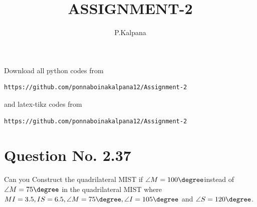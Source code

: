 \documentclass[journal,12pt,twocolumn]{IEEEtran}
\begin{document}
     \def\centbox#1{\makebox[0in]{#1}}
     \def\topbox#1{\raisebox{-\baselineskip}[0in][0in]{#1}}
     \def\midbox#1{\raisebox{-0.5\baselineskip}[0in][0in]{#1}}
\vspace{3cm}
\title{ASSIGNMENT-2}
\author{P.Kalpana}
\maketitle
\newpage
\bigskip
\renewcommand{\thefigure}{\theenumi}
\renewcommand{\thetable}{\theenumi}
Download all python codes from 
\begin{lstlisting}
https://github.com/ponnaboinakalpana12/Assignment-2
\end{lstlisting}
%
and latex-tikz codes from 
%
\begin{lstlisting}
https://github.com/ponnaboinakalpana12/Assignment-2
\end{lstlisting}
%
\section{Question No. 2.37}
Can you Construct the quadrilateral MIST if $\angle M=100\degree $instead of$ \angle M =75\degree$ in the quadrilateral MIST where  $MI = 3.5, IS = 6.5, \angle M = 75 \degree, \angle I = 105 \degree$ and $\angle S = 120 \degree$.
%
\end{document}
